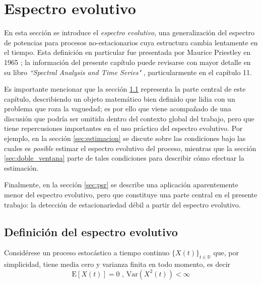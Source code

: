 \documentclass[12pt,letterpaper,draft]{book}
\newcommand{\R}{\mathbb{R}}
\newcommand{\E}[1]{\mathrm{E}\left[ #1 \right]}
\newcommand{\Var}[1]{\mathrm{Var}\left( #1 \right)}
\newcommand{\xtin}[1]{$\{X(t)\}_{t\in \mathcal{ #1 }}$ }
\begin{document}
\chapter{Espectro evolutivo}
\label{capitulo:espectro_evo}

En esta sección se introduce el \textit{espectro evolutivo}, una generalización del espectro de potencias para procesos no-estacionarios cuya estructura cambia lentamente en el tiempo.
%
Esta definición en particular fue presentada por Maurice Priestley en 1965 \cite{Priestley65}; la información del presente capítulo puede revisarse con mayor detalle en su libro \textit{``Spectral Analysis and Time Series"} \cite{Priestley81}, particularmente en el capítulo 11.

Es importante mencionar que la sección \ref{sec:espectro} representa la parte central de este capítulo, describiendo un objeto matemático bien definido que lidia con un problema que roza la vaguedad; es por ello que viene acompañado de una discusión que podría ser omitida dentro del contexto global del trabajo, pero que tiene repercusiones importantes en el uso práctico del espectro evolutivo.
%
Por ejemplo, en la sección \ref{sec:estimacion} se discute sobre las condiciones bajo las cuales es \textit{posible} estimar el espectro evolutivo del proceso, mientras que la sección \ref{sec:doble_ventana} parte de tales condiciones para describir cómo efectuar la estimación.

Finalmente, en la sección \ref{sec:psr} se describe una aplicación aparentemente menor del espectro evolutivo, pero que constituye una parte central en el presente trabajo: la detección de estacionariedad débil a partir del espectro evolutivo.


\section{Definición del espectro evolutivo}
\label{sec:espectro}

Considérese un proceso estocástico a tiempo continuo \xtin{\R} que, por simplicidad, tiene media cero y varianza finita en todo momento, es decir
\begin{equation*}
\E{X(t)} = 0 \text{  ,  } \Var{X^{2}(t)} < \infty
\end{equation*}
\end{document}
